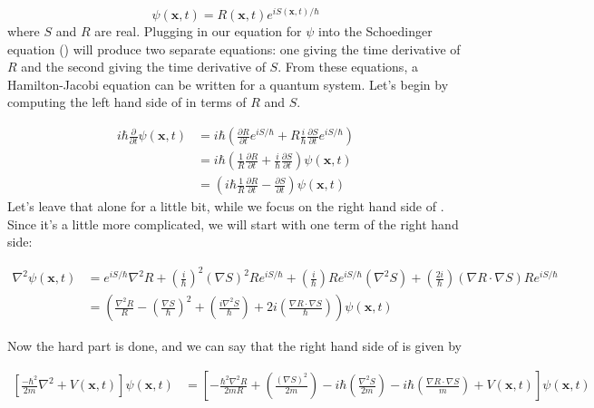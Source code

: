 \begin{equation}
\psi(\mathbf{x},t) = R(\mathbf{x},t) e^{i S(\mathbf{x},t) / \hbar}
\end{equation}
where $S$ and $R$ are real. Plugging in our equation for $\psi$ into the Schoedinger equation () will produce two separate equations: one giving the time derivative of $R$ and the second giving the time derivative of $S$. From these equations, a Hamilton-Jacobi equation can be written for a quantum system.
    Let's begin by computing the left hand side of  in terms of $R$ and $S$.   

$$
\begin{align*}
i\hbar\frac{\partial}{\partial t} \psi(\mathbf{x},t) &= i \hbar\left(\frac{\partial R}{\partial t} e^{i S / \hbar} + R \frac{i}{\hbar}\frac{\partial S}{\partial t} e^{i S / \hbar}\right)
\\ &= i \hbar \left(\frac{1}{R} \frac{\partial R}{\partial t} + \frac{i}{\hbar}\frac{\partial S}{\partial t}\right) \psi(\mathbf{x},t) 
\\ &= \left(i \hbar \frac{1}{R} \frac{\partial R}{\partial t} - \frac{\partial S}{\partial t}\right) \psi(\mathbf{x},t)
\end{align*}
$$
Let's leave that alone for a little bit, while we focus on the right hand side of . Since it's a little more complicated, we will start with one term of the right hand side:

$$
\begin{align*}
\nabla^2 \psi(\mathbf{x},t)  &= e^{i S / \hbar} \nabla^2 R + \left(\frac{i}{\hbar}\right)^2 (\nabla S)^2 R e^{i S / \hbar} + \left(\frac{i}{\hbar}\right) R e^{i S / \hbar} (\nabla^2 S) + \left(\frac{2i}{\hbar}\right) (\nabla R \cdot \nabla S) R e^{i S / \hbar}
\\ &= \left(\frac{\nabla^2 R}{R} - \left(\frac{\nabla S}{\hbar}\right)^2  + \left(\frac{i \nabla^2 S}{\hbar}\right) + 2 i \left(\frac{\nabla R \cdot \nabla S}{\hbar}\right) \right) \psi(\mathbf{x},t) 
\end{align*}
$$

Now the hard part is done, and we can say that the right hand side of  is given by 

$$
\begin{align*} 
\left [ \frac{-\hbar^2}{2 m}\nabla^2 + V(\mathbf{x},t)\right ]\psi(\mathbf{x},t) &= \left [-\frac{\hbar^2  \nabla^2 R}{2 m R} + \left(\frac{(\nabla S)^2}{2 m}\right)  - i \hbar \left(\frac{\nabla^2 S}{2 m}\right) - i \hbar \left(\frac{\nabla R \cdot \nabla S}{m}\right) + V(\mathbf{x},t) \right]\psi(\mathbf{x},t) 
\end{align*}
$$

